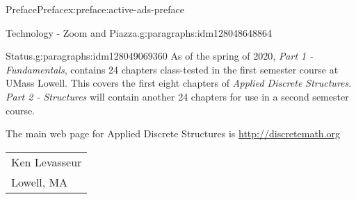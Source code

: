 \documentclass[oneside,10pt,]{book}
\numberwithin{equation}{section}
\begin{document}
\begin{preface}{Preface}{}{Preface}{}{}{x:preface:active-ads-preface}
\begin{paragraphs}{Technology - Zoom and Piazza.}{g:paragraphs:idm128048648864}
\end{paragraphs}%
\begin{paragraphs}{Status.}{g:paragraphs:idm128049069360}%
As of the spring of 2020, \emph{Part 1 - Fundamentals}, contains 24 chapters class-tested in the first semester course at UMass Lowell. This covers the first eight chapters of \emph{Applied Discrete Structures}. \emph{Part 2 - Structures} will contain another 24 chapters for use in a second semester course.%
\end{paragraphs}%
\par
The main web page for Applied Discrete Structures is \url{http://discretemath.org}%
\nopagebreak\par%
\hfill\begin{tabular}[t]{l@{}}
Ken Levasseur\\
Lowell, MA
\end{tabular}\\\par
\end{preface}
\setcounter{tocdepth}{0}
\renewcommand*\contentsname{Contents}
\tableofcontents
\mainmatter
%
%
\typeout{************************************************}
\typeout{************************************************}
%
\end{document}
